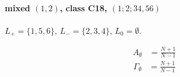\documentclass[11pt]{article}
\begin{document}
\paragraph{mixed $(1,2)$, class C18, $(1;2;34,56)$}

$L_+=\{1,5,6\}$, $L_-=\{2,3,4\}$, $L_0=\emptyset$.

\begin{align*}
  A_{\emptyset} &= \frac{N + 1}{N - 1} 
\end{align*}
\begin{align*}
  \Gamma_{\emptyset} &= \frac{N + 1}{N - 1} 
\end{align*}
\end{document}
